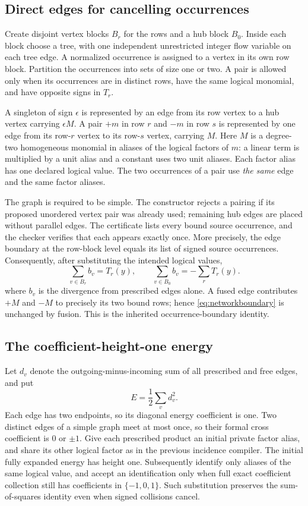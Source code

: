 \subsection{Direct edges for cancelling occurrences}
Create disjoint vertex blocks $B_r$ for the rows and a hub block $B_0$.
Inside each block choose a tree, with one independent unrestricted integer
flow variable on each tree edge. A normalized occurrence is assigned to a
vertex in its own row block. Partition the occurrences into sets of size
one or two. A pair is allowed only when its occurrences are in distinct
rows, have the same logical monomial, and have opposite signs in $T_r$.

A singleton of sign $\epsilon$ is represented by an edge from its row
vertex to a hub vertex carrying $\epsilon M$. A pair $+m$ in row $r$ and
$-m$ in row $s$ is represented by one edge from its row-$r$ vertex to its
row-$s$ vertex, carrying $M$. Here $M$ is a degree-two homogeneous
monomial in aliases of the logical factors of $m$: a linear term is
multiplied by a unit alias and a constant uses two unit aliases. Each factor
alias has one declared logical value. The two occurrences of a pair use
\emph{the same} edge and the same factor aliases.

The graph is required to be simple. The constructor rejects a pairing if
its proposed unordered vertex pair was already used; remaining hub edges
are placed without parallel edges. The certificate lists every bound
source occurrence, and the checker verifies that each appears exactly
once. More precisely, the edge boundary at the row-block level equals its
list of signed source occurrences. Consequently, after substituting the
intended logical values,
\begin{equation}\label{eq:networkboundary}
 \sum_{v\in B_r} b_v=T_r(y),\qquad
 \sum_{v\in B_0} b_v=-\sum_rT_r(y).
\end{equation}
where $b_v$ is the divergence from prescribed edges alone. A fused edge
contributes $+M$ and $-M$ to precisely its two bound rows; hence \eqref{eq:networkboundary} is
unchanged by fusion. This is the inherited occurrence-boundary identity.

\subsection{The coefficient-height-one energy}
Let $d_v$ denote the outgoing-minus-incoming sum of all prescribed and
free edges, and put
\[
 E=\frac12\sum_vd_v^2.
\]
Each edge has two endpoints, so its diagonal energy coefficient is one.
Two distinct edges of a simple graph meet at most once, so their formal
cross coefficient is $0$ or $\pm1$. Give each prescribed product an
initial private factor alias, and share its other logical factor as in the
previous incidence compiler. The initial fully expanded energy has height
one. Subsequently identify only aliases of the same logical value, and
accept an identification only when full exact coefficient collection
still has coefficients in $\{-1,0,1\}$. Such substitution preserves the
sum-of-squares identity even when signed collisions cancel.

